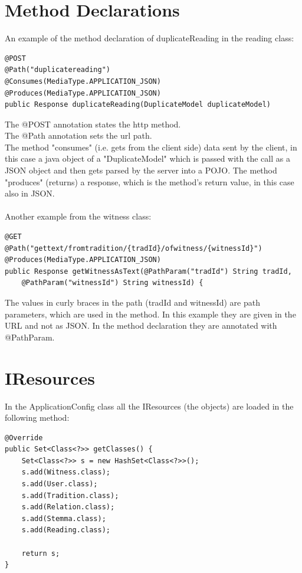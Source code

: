 \documentclass[11pt,fleqn,openany]{book} %
\begin{document}
\section*{Method Declarations}
An example of the method declaration of duplicateReading in the reading class:

\begin{lstlisting}
@POST
@Path("duplicatereading")
@Consumes(MediaType.APPLICATION_JSON)
@Produces(MediaType.APPLICATION_JSON)
public Response duplicateReading(DuplicateModel duplicateModel)
\end{lstlisting}

The @POST annotation states the http method.\\
The @Path annotation sets the url path.\\
The method "consumes" (i.e. gets from the client side) data sent by the client, in this case a java object of a "DuplicateModel" which is passed with the call as a JSON object and then gets parsed by the server into a POJO. The method "produces" (returns) a response, which is the method's return value, in this case also in JSON. 
\\\\
Another example from the witness class:

\begin{lstlisting}
@GET
@Path("gettext/fromtradition/{tradId}/ofwitness/{witnessId}")
@Produces(MediaType.APPLICATION_JSON)
public Response getWitnessAsText(@PathParam("tradId") String tradId,		
	@PathParam("witnessId") String witnessId) {
\end{lstlisting}

The values in curly braces in the path (tradId and witnessId) are path parameters, which are used in the method. In this example they are given in the URL and not as JSON. In the method declaration they are annotated with @PathParam. 

\section*{IResources}
In the ApplicationConfig class all the IResources (the objects) are loaded in the following method:

\begin{lstlisting}
@Override
public Set<Class<?>> getClasses() {
	Set<Class<?>> s = new HashSet<Class<?>>();
	s.add(Witness.class);
	s.add(User.class);
	s.add(Tradition.class);
	s.add(Relation.class);
	s.add(Stemma.class);
	s.add(Reading.class);
	
	return s;
}
\end{lstlisting}
\end{document}
